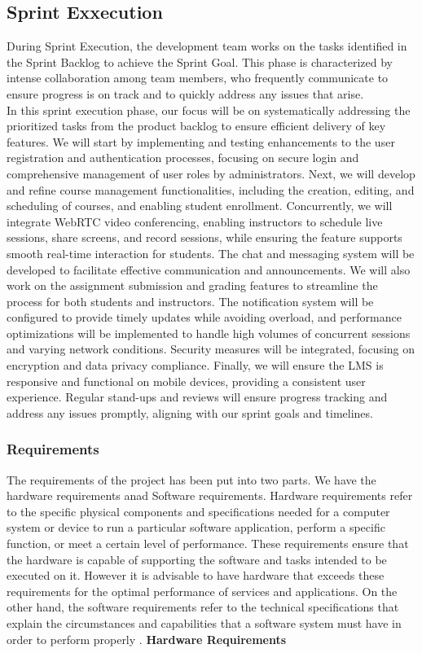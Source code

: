 \documentclass[a4paper,12pt]{article}  %
\begin{document}
\subsection{Sprint Exxecution}
During Sprint Execution, the development team works on the tasks identified in
the Sprint Backlog to achieve the Sprint Goal. This phase is characterized by
intense collaboration among team members, who frequently communicate to ensure
progress is on track and to quickly address any issues that
arise.\cite{beck2001agile}\\ In this sprint execution phase, our focus will be
on systematically addressing the prioritized tasks from the product backlog to
ensure efficient delivery of key features. We will start by implementing and
testing enhancements to the user registration and authentication processes,
focusing on secure login and comprehensive management of user roles by
administrators. Next, we will develop and refine course management
functionalities, including the creation, editing, and scheduling of courses,
and enabling student enrollment. Concurrently, we will integrate WebRTC video
conferencing, enabling instructors to schedule live sessions, share screens,
and record sessions, while ensuring the feature supports smooth real-time
interaction for students. The chat and messaging system will be developed to
facilitate effective communication and announcements. We will also work on the
assignment submission and grading features to streamline the process for both
students and instructors. The notification system will be configured to provide
timely updates while avoiding overload, and performance optimizations will be
implemented to handle high volumes of concurrent sessions and varying network
conditions. Security measures will be integrated, focusing on encryption and
data privacy compliance. Finally, we will ensure the LMS is responsive and
functional on mobile devices, providing a consistent user experience. Regular
stand-ups and reviews will ensure progress tracking and address any issues
promptly, aligning with our sprint goals and timelines.

\subsubsection{Requirements}
The requirements of the project has been put into two parts. We have the
hardware requirements anad Software requirements. Hardware requirements refer
to the specific physical components and specifications needed for a computer
system or device to run a particular software application, perform a specific
function, or meet a certain level of performance. These requirements ensure
that the hardware is capable of supporting the software and tasks intended to
be executed on it. However it is advisable to have hardware that exceeds these
requirements for the optimal performance of services and
applications\cite{HANNIFIN201017}. On the other hand, the software requirements
refer to the technical specifications that explain the circumstances and
capabilities that a software system must have in order to perform properly
\cite{geeksforgeeks2024}. \clearpage \textbf{Hardware Requirements}\\
\end{document}
